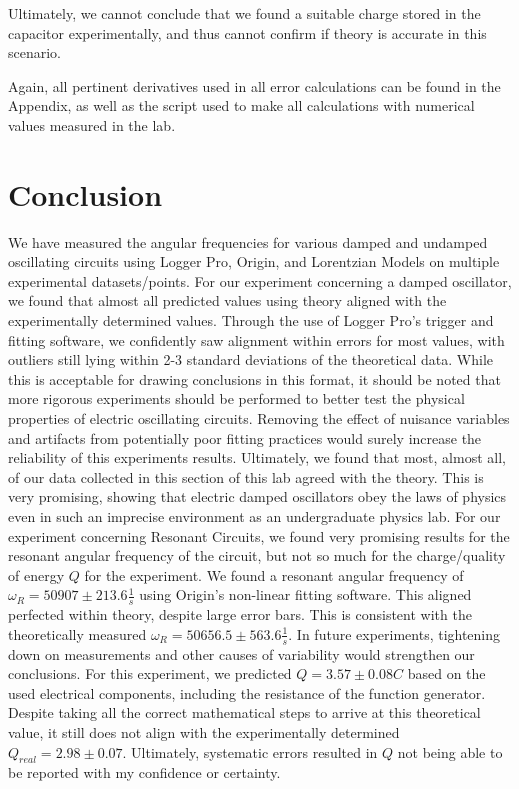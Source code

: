 \documentclass[12pt]{article}
\begin{document}
Ultimately, we cannot conclude that we found a suitable charge stored in the capacitor experimentally, and thus cannot confirm if theory is accurate in this scenario.

Again, all pertinent derivatives used in all error calculations can be found in the Appendix, as well as the script used to make all calculations with numerical values measured in the lab.

\section{Conclusion}
We have measured the angular frequencies for various damped and undamped oscillating circuits using Logger Pro, Origin, and Lorentzian Models on multiple experimental datasets/points. For our experiment concerning a damped oscillator, we found that almost all predicted values using theory aligned with the experimentally determined values. Through the use of Logger Pro's trigger and fitting software, we confidently saw alignment within errors for most values, with outliers still lying within 2-3 standard deviations of the theoretical data. While this is acceptable for drawing conclusions in this format, it should be noted that more rigorous experiments should be performed to better test the physical properties of electric oscillating circuits. Removing the effect of nuisance variables and artifacts from potentially poor fitting practices would surely increase the reliability of this experiments results. Ultimately, we found that most, almost all, of our data collected in this section of this lab agreed with the theory. This is very promising, showing that electric damped oscillators obey the laws of physics even in such an imprecise environment as an undergraduate physics lab. For our experiment concerning Resonant Circuits, we found very promising results for the resonant angular frequency of the circuit, but not so much for the charge/quality of energy $Q$ for the experiment. We found a resonant angular frequency of $\omega_R=50907\pm213.6 \frac{1}{s}$ using Origin's non-linear fitting software. This aligned perfected within theory, despite large error bars. This is consistent with the theoretically measured $\omega_R=50656.5\pm563.6\frac{1}{s}$. In future experiments, tightening down on measurements and other causes of variability would strengthen our conclusions. For this experiment, we predicted $Q=3.57\pm0.08C$ based on the used electrical components, including the resistance of the function generator. Despite taking all the correct mathematical steps to arrive at this theoretical value, it still does not align with the experimentally determined $Q_{real}=2.98\pm0.07$. Ultimately, systematic errors resulted in $Q$ not being able to be reported with my confidence or certainty.
\end{document}
